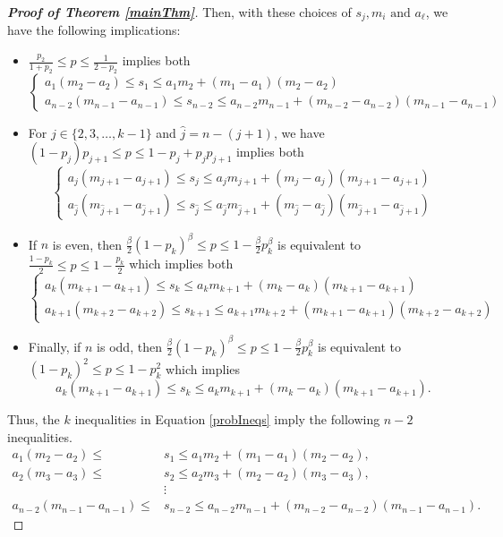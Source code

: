 \documentclass[11pt]{article}
\theoremstyle{definition}
\begin{document}
\begin{proof}[\bf{Proof of Theorem \ref{mainThm}}]
    Then, with these choices of $s_j,m_i \text{ and } a_\ell$, we have the following implications:
    \begin{itemize}
        \item $\frac{p_2}{1+p_2} \leq p \leq \frac{1}{2-p_2}$ implies both
        $$\begin{cases} a_1(m_2-a_2) \leq s_1 \leq a_1m_2 + (m_1-a_1)(m_2-a_2) \\ a_{n-2}(m_{n-1}-a_{n-1}) \leq s_{n-2} \leq a_{n-2}m_{n-1} + (m_{n-2}-a_{n-2})(m_{n-1}-a_{n-1}) \end{cases}$$
        \item For $j \in \{ 2,3,\dots,k-1 \}$ and $\hat{j} = n-(j+1)$, we have $(1-p_{j})p_{j+1} \leq p \leq 1-p_{j}+p_{j}p_{j+1}$ implies both
        $$\begin{cases} a_j(m_{j+1}-a_{j+1}) \leq s_j \leq a_jm_{j+1} + (m_j-a_j)(m_{j+1}-a_{j+1}) \\ a_{\hat{j}}(m_{\hat{j}+1}-a_{\hat{j}+1}) \leq s_{\hat{j}} \leq a_{\hat{j}}m_{\hat{j}+1} + (m_{\hat{j}}-a_{\hat{j}})(m_{\hat{j}+1}-a_{\hat{j}+1}) \end{cases}$$
        \item If $n$ is even, then $\frac{\beta}{2}(1-p_k)^\beta \leq p \leq 1-\frac{\beta}{2}p_k^\beta$ is equivalent to $\frac{1-p_k}{2} \leq p \leq 1-\frac{p_k}{2}$ which implies both
        $$\begin{cases} a_k(m_{k+1}-a_{k+1}) \leq s_k \leq a_km_{k+1} + (m_k-a_k)(m_{k+1}-a_{k+1}) \\ a_{k+1}(m_{k+2}-a_{k+2}) \leq s_{k+1} \leq a_{k+1}m_{k+2} + (m_{k+1}-a_{k+1})(m_{k+2}-a_{k+2}) \end{cases}$$
        \item Finally, if $n$ is odd, then $\frac{\beta}{2}(1-p_k)^\beta \leq p \leq 1-\frac{\beta}{2}p_k^\beta$ is equivalent to $(1-p_k)^2 \leq p \leq 1-p_k^2$ which implies
        $$a_k(m_{k+1}-a_{k+1}) \leq s_k \leq a_km_{k+1} + (m_k-a_k)(m_{k+1}-a_{k+1}).$$
    \end{itemize}
    Thus, the $k$ inequalities in Equation \ref{probIneqs} imply the following $n-2$ inequalities.
    \begin{align*}
        a_1(m_2-a_2) \leq &s_1 \leq a_1m_2 + (m_1-a_1)(m_2-a_2), \\
        a_2(m_3-a_3) \leq &s_2 \leq a_2m_3 + (m_2-a_2)(m_3-a_3), \\
        &\vdots \\
        a_{n-2}(m_{n-1}-a_{n-1}) \leq &s_{n-2} \leq a_{n-2}m_{n-1} + (m_{n-2}-a_{n-2})(m_{n-1}-a_{n-1}).

\end{align*}
\end{proof}
\end{document}
